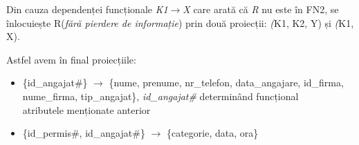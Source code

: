 \documentclass[12pt, a4paper]{article}
\begin{document}
Din cauza dependenței funcționale \emph{K1}$\rightarrow$\emph{X} care arată că \emph{R} nu este în FN2, se înlocuiește R(\emph{fără pierdere de informație}) prin două proiecții: \emph(K1, K2, Y) și \emph(K1, X).

Astfel avem în final proiecțiile:

\begin{itemize}
    \item \{id\_angajat\#\} $\rightarrow$ \{nume, prenume, nr\_telefon, data\_angajare, id\_firma, nume\_firma, tip\_angajat\}, \emph{id\_angajat\#} determinând funcțional\\ atributele menționate anterior
    \item \{id\_permis\#, id\_angajat\#\} $\rightarrow$ \{categorie, data, ora\}
\end{itemize}

\begin{table}[!htbp]
\begin{center}
\caption{Proiectia \emph{R1(K1, K2, Y)}}\label{tab3}
\end{center}
\end{table}

\begin{table}[!htbp]
\begin{center}
\caption{Proiectia \emph{R2(K1, X)}}\label{tab4}
\end{center}
\end{table}
\end{document}
